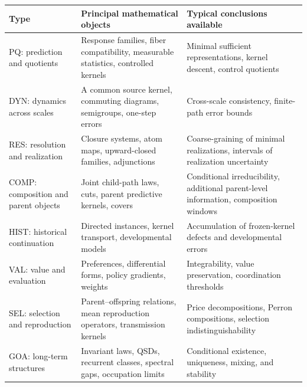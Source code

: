 \documentclass[
  english,
  11pt,
  oneside]{book}
\newcounter{none} %
\begin{document}
{\def\LTcaptype{none} %
\begin{longtable}[]{@{}
  >{\raggedright\arraybackslash}p{}
  >{\raggedright\arraybackslash}p{}
  >{\raggedright\arraybackslash}p{}@{}}
\toprule\noalign{}
\begin{minipage}[b]{\linewidth}\raggedright
Type
\end{minipage} & \begin{minipage}[b]{\linewidth}\raggedright
Principal mathematical objects
\end{minipage} & \begin{minipage}[b]{\linewidth}\raggedright
Typical conclusions available
\end{minipage} \\
\midrule\noalign{}
\endhead
\bottomrule\noalign{}
\endlastfoot
PQ: prediction and quotients & Response families, fiber compatibility, measurable statistics, controlled kernels & Minimal sufficient representations, kernel descent, control quotients \\
DYN: dynamics across scales & A common source kernel, commuting diagrams, semigroups, one-step errors & Cross-scale consistency, finite-path error bounds \\
RES: resolution and realization & Closure systems, atom maps, upward-closed families, adjunctions & Coarse-graining of minimal realizations, intervals of realization uncertainty \\
COMP: composition and parent objects & Joint child-path laws, cuts, parent predictive kernels, covers & Conditional irreducibility, additional parent-level information, composition windows \\
HIST: historical continuation & Directed instances, kernel transport, developmental models & Accumulation of frozen-kernel defects and developmental errors \\
VAL: value and evaluation & Preferences, differential forms, policy gradients, weights & Integrability, value preservation, coordination thresholds \\
SEL: selection and reproduction & Parent--offspring relations, mean reproduction operators, transmission kernels & Price decompositions, Perron compositions, selection indistinguishability \\
GOA: long-term structures & Invariant laws, QSDs, recurrent classes, spectral gaps, occupation limits & Conditional existence, uniqueness, mixing, and stability \\
\end{longtable}
}
\end{document}
